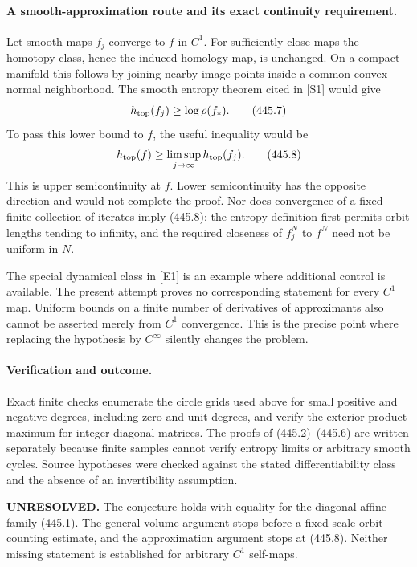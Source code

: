 \documentclass[11pt]{article}
\begin{document}
\paragraph{A smooth-approximation route and its exact continuity requirement.}
Let smooth maps $f_j$ converge to $f$ in $C^1$. For sufficiently close maps the homotopy class, hence the induced homology map, is unchanged. On a compact manifold this follows by joining nearby image points inside a common convex normal neighborhood. The smooth entropy theorem cited in [S1] would give
\[
 h_{\rm top}(f_j)\ge\log\rho(f_*).
 \tag{445.7}
\]
To pass this lower bound to $f$, the useful inequality would be
\[
 h_{\rm top}(f)\ge\limsup_{j\to\infty}h_{\rm top}(f_j).
 \tag{445.8}
\]
This is upper semicontinuity at $f$. Lower semicontinuity has the opposite direction and would not complete the proof. Nor does convergence of a fixed finite collection of iterates imply (445.8): the entropy definition first permits orbit lengths tending to infinity, and the required closeness of $f_j^N$ to $f^N$ need not be uniform in $N$.

The special dynamical class in [E1] is an example where additional control is available. The present attempt proves no corresponding statement for every $C^1$ map. Uniform bounds on a finite number of derivatives of approximants also cannot be asserted merely from $C^1$ convergence. This is the precise point where replacing the hypothesis by $C^\infty$ silently changes the problem.

\paragraph{Verification and outcome.}
Exact finite checks enumerate the circle grids used above for small positive and negative degrees, including zero and unit degrees, and verify the exterior-product maximum for integer diagonal matrices. The proofs of (445.2)--(445.6) are written separately because finite samples cannot verify entropy limits or arbitrary smooth cycles. Source hypotheses were checked against the stated differentiability class and the absence of an invertibility assumption.

\textbf{UNRESOLVED.} The conjecture holds with equality for the diagonal affine family (445.1). The general volume argument stops before a fixed-scale orbit-counting estimate, and the approximation argument stops at (445.8). Neither missing statement is established for arbitrary $C^1$ self-maps.
\end{document}
